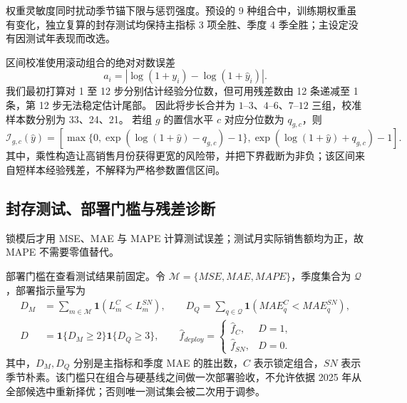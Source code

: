 权重灵敏度同时扰动季节锚下限与惩罚强度。预设的 9 种组合中，训练期权重虽有变化，独立复算的封存测试均保持主指标 3 项全胜、季度 4 季全胜；主设定没有因测试年表现而改选。%

区间校准使用滚动组合的绝对对数误差
\begin{equation}
    a_i=\left|\log(1+y_i)-\log(1+\widehat y_i)\right|.
\end{equation}
我们最初打算对 1 至 12 步分别估计经验分位数，但可用残差数由 12 条递减至 1 条，第 12 步无法稳定估计尾部。%
因此将步长合并为 $1$--$3$、$4$--$6$、$7$--$12$ 三组，校准样本数分别为 33、24、21。%
若组 $g$ 的置信水平 $c$ 对应分位数为 $q_{g,c}$，则
\begin{equation}
    \mathcal I_{g,c}(\widehat y)=
    \left[
    \max\{0,\exp(\log(1+\widehat y)-q_{g,c})-1\},
    \exp(\log(1+\widehat y)+q_{g,c})-1
    \right].
\end{equation}
其中，乘性构造让高销售月份获得更宽的风险带，并把下界截断为非负；该区间来自短样本经验残差，不解释为严格参数置信区间。

\subsection{封存测试、部署门槛与残差诊断}

锁模后才用 MSE、MAE 与 MAPE 计算测试误差；测试月实际销售额均为正，故 MAPE 不需要零值替代。%

部署门槛在查看测试结果前固定。令 $\mathcal M=\{MSE,MAE,MAPE\}$，季度集合为 $\mathcal Q$，部署指示量写为
\begin{equation}
\begin{aligned}
    D_M&=\sum_{m\in\mathcal M}\mathbf 1(L_m^{C}<L_m^{SN}),
    \qquad
    D_Q=\sum_{q\in\mathcal Q}\mathbf 1(MAE_q^{C}<MAE_q^{SN}),\\
    D&=\mathbf 1\{D_M\geq 2\}\mathbf 1\{D_Q\geq 3\},
    \qquad
    \widehat f_{deploy}=\begin{cases}
    \widehat f_C,&D=1,\\
    \widehat f_{SN},&D=0.
    \end{cases}
\end{aligned}
\end{equation} %
其中，$D_M,D_Q$ 分别是主指标和季度 MAE 的胜出数，$C$ 表示锁定组合，$SN$ 表示季节朴素。该门槛只在组合与硬基线之间做一次部署验收，不允许依据 2025 年从全部候选中重新择优；否则唯一测试集会被二次用于调参。%

